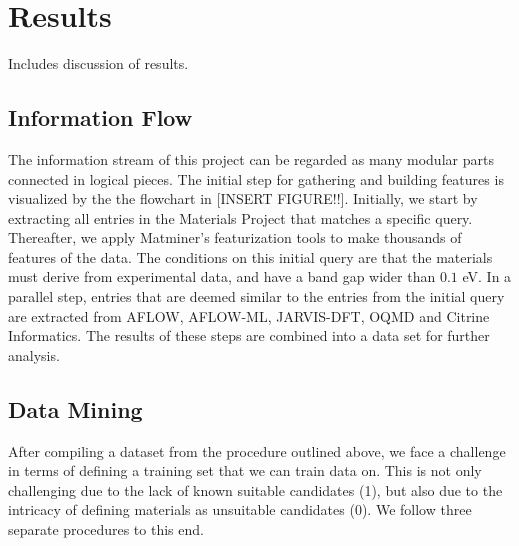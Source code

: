 \documentclass[superscriptaddress,unsortedaddress,
 amsmath,amssymb,
 aps,
]{revtex4-2}
\begin{document}
\section*{Results}
Includes discussion of results.  

\subsection*{Information Flow}  %

The information stream of this project can be regarded as many
modular parts connected in logical pieces. The initial step for
gathering and building features is visualized by the
the flowchart in [INSERT FIGURE!!]. 
Initially, we start by extracting all entries in
the Materials Project that matches a specific query. 
Thereafter, we apply Matminer’s\cite{Ward2018}
featurization tools to make thousands
of features of the data. The conditions on this initial query are that the
materials must
derive from experimental data, and have a band gap wider than $0.1$ eV.
In a parallel step, entries that are deemed
similar to the entries from the initial query
are extracted from AFLOW\cite{Curtarolo2012, Curtarolo2012a, Calderon2015},
AFLOW-ML\cite{Isayev2017},
JARVIS-DFT, %
OQMD\cite{Saal2013,Kirklin2015}
and
Citrine Informatics. The results of these steps are combined into
a data set for further analysis.



\subsection*{Data Mining}

After compiling a dataset from the procedure outlined above, we 
face a challenge in terms of defining a training set that we can 
train data on. This is not only challenging due to the lack of known
suitable candidates (1), but also due to the intricacy of defining
materials as unsuitable candidates (0). We follow three separate
procedures to this end.
\end{document}
